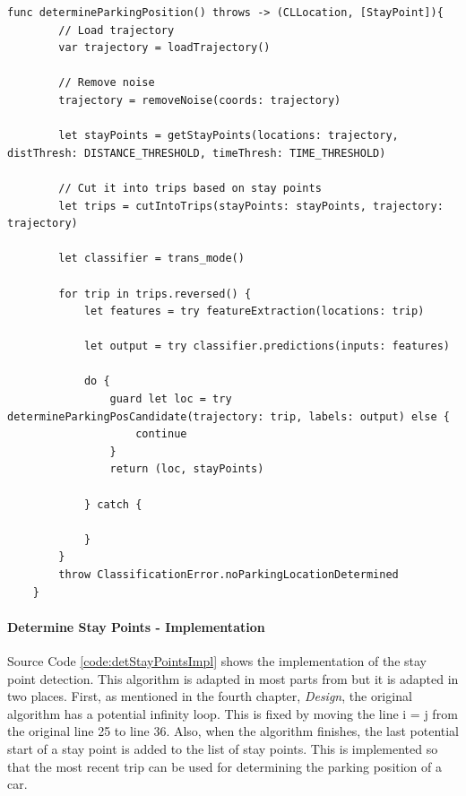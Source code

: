 \begin{lstlisting}[style=swift, caption={Implementation of Algorithm to Determine Parking Position of the User's Car}, label={code:detParkPosImpl}]
func determineParkingPosition() throws -> (CLLocation, [StayPoint]){
        // Load trajectory
        var trajectory = loadTrajectory()
        
        // Remove noise
        trajectory = removeNoise(coords: trajectory)
        
        let stayPoints = getStayPoints(locations: trajectory, distThresh: DISTANCE_THRESHOLD, timeThresh: TIME_THRESHOLD)
        
        // Cut it into trips based on stay points
        let trips = cutIntoTrips(stayPoints: stayPoints, trajectory: trajectory)
        
        let classifier = trans_mode()
        
        for trip in trips.reversed() {
            let features = try featureExtraction(locations: trip)
            
            let output = try classifier.predictions(inputs: features)
            
            do {
                guard let loc = try determineParkingPosCandidate(trajectory: trip, labels: output) else {
                    continue
                }
                return (loc, stayPoints)
                
            } catch {
            
            }
        }
        throw ClassificationError.noParkingLocationDetermined
    }
\end{lstlisting}

\paragraph{Determine Stay Points - Implementation}
Source Code \ref{code:detStayPointsImpl} shows the implementation of the stay point detection. This algorithm is adapted in most parts from \cite{li2008mining} but it is adapted in two places. First, as mentioned in the fourth chapter, \textit{Design}, the original algorithm has a potential infinity loop. This is fixed by moving the line i = j from the original line 25 to line 36. Also, when the algorithm finishes, the last potential start of a stay point is added to the list of stay points. This is implemented so that the most recent trip can be used for determining the parking position of a car. 


